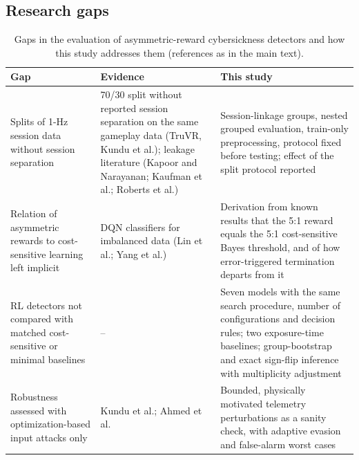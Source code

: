 \subsection{Research gaps}
\begin{table}[h]
\centering
\caption{Gaps in the evaluation of asymmetric-reward cybersickness detectors and how this study addresses them (references as in the main text).}
\footnotesize
\begin{tabular}{p{}p{}p{}}
\toprule
Gap & Evidence & This study \\
\midrule
Splits of 1-Hz session data without session separation & 70/30 split without reported session separation on the same gameplay data (TruVR, Kundu et al.); leakage literature (Kapoor and Narayanan; Kaufman et al.; Roberts et al.) & Session-linkage groups, nested grouped evaluation, train-only preprocessing, protocol fixed before testing; effect of the split protocol reported \\
Relation of asymmetric rewards to cost-sensitive learning left implicit & DQN classifiers for imbalanced data (Lin et al.; Yang et al.) & Derivation from known results that the 5:1 reward equals the 5:1 cost-sensitive Bayes threshold, and of how error-triggered termination departs from it \\
RL detectors not compared with matched cost-sensitive or minimal baselines & -- & Seven models with the same search procedure, number of configurations and decision rules; two exposure-time baselines; group-bootstrap and exact sign-flip inference with multiplicity adjustment \\
Robustness assessed with optimization-based input attacks only & Kundu et al.; Ahmed et al. & Bounded, physically motivated telemetry perturbations as a sanity check, with adaptive evasion and false-alarm worst cases \\
\bottomrule
\end{tabular}
\end{table}

